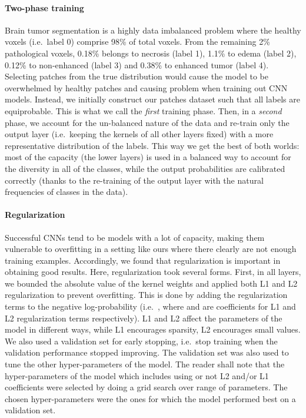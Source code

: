 \documentclass[final,5p,times,twocolumn]{elsarticle}
\begin{document}
\paragraph{Two-phase training}

\label{twopahsetraining}

Brain tumor segmentation is a highly data imbalanced problem where the healthy voxels (i.e.\ label 0) comprise 98\% of total voxels. From the remaining 2\% pathological voxels,  0.18\% belongs to necrosis (label 1), 1.1\% to edema (label 2), 0.12\% to non-enhanced (label 3) and 0.38\% to enhanced tumor (label 4). Selecting patches from the true distribution would cause the model to be overwhelmed by healthy patches and causing problem when training out CNN models. Instead, we initially construct our patches dataset such that all labels are equiprobable. This is what we call the {\em first} training phase.  Then, in a {\em second} phase, we  account for the un-balanced nature of the data and re-train only the output layer (i.e.\ keeping the kernels of all other layers fixed) with a more representative distribution of the labels. This way we get the best of both worlds: most of the capacity (the lower layers) is used in a balanced way to account for the diversity in all of the classes, while the output probabilities are calibrated correctly (thanks to the re-training of the output layer with the natural frequencies of classes in the data).



\paragraph{Regularization}

Successful CNNs tend to be models with a lot of capacity, making them vulnerable to overfitting in a setting like ours where there clearly are not enough training examples.   Accordingly, we found that regularization is important in obtaining good results. Here, regularization took several forms. First, in all layers, we bounded the absolute value of the kernel weights and applied both L1 and L2 regularization to prevent overfitting. This is done by adding the regularization terms to the negative log-probability (i.e.\ , where  and  are coefficients for L1 and L2 regularization terms respectively). L1 and L2 affect the parameters of the model in different ways, while L1 encourages sparsity, L2 encourages small values. 
We also used a validation set for early stopping, i.e.\ stop training when the validation performance stopped improving. The validation set was also used to tune the other hyper-parameters of the model. The reader shall note that the hyper-parameters of the model which includes using or not L2 and/or L1 coefficients were selected by doing a grid search over range of parameters.  The chosen hyper-parameters were the ones for which the model performed best on a validation set.
\end{document}
